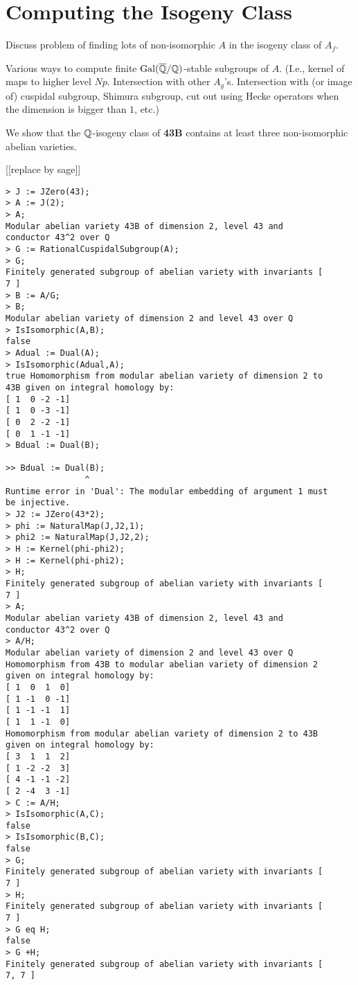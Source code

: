 \documentclass{article}
\begin{document}
\section{Computing the Isogeny Class}

Discuss problem of finding lots of non-isomorphic $A$ in the isogeny
class of $A_f$.

Various ways to compute finite $\operatorname{Gal}(\overline{\mathbb{Q}}/\mathbb{Q})$-stable subgroups of
$A$.  (I.e., kernel of maps to higher level $Np$.  Intersection with
other $A_g$'s.  Intersection with (or image of) cuspidal subgroup,
Shimura subgroup, cut out using Hecke operators when the dimension is
bigger than $1$, etc.)

\begin{example}
We show that the $\mathbb{Q}$-isogeny class of {\bf 43B} contains at least three
non-isomorphic abelian varieties.

[[replace by sage]]

\begin{verbatim}
> J := JZero(43);
> A := J(2);
> A;
Modular abelian variety 43B of dimension 2, level 43 and
conductor 43^2 over Q
> G := RationalCuspidalSubgroup(A);
> G;
Finitely generated subgroup of abelian variety with invariants [
7 ]
> B := A/G;
> B;
Modular abelian variety of dimension 2 and level 43 over Q
> IsIsomorphic(A,B);
false
> Adual := Dual(A);
> IsIsomorphic(Adual,A);
true Homomorphism from modular abelian variety of dimension 2 to
43B given on integral homology by:
[ 1  0 -2 -1]
[ 1  0 -3 -1]
[ 0  2 -2 -1]
[ 0  1 -1 -1]
> Bdual := Dual(B);

>> Bdual := Dual(B);
                ^
Runtime error in 'Dual': The modular embedding of argument 1 must
be injective.
> J2 := JZero(43*2);
> phi := NaturalMap(J,J2,1);
> phi2 := NaturalMap(J,J2,2);
> H := Kernel(phi-phi2);
> H := Kernel(phi-phi2);
> H;
Finitely generated subgroup of abelian variety with invariants [
7 ]
> A;
Modular abelian variety 43B of dimension 2, level 43 and
conductor 43^2 over Q
> A/H;
Modular abelian variety of dimension 2 and level 43 over Q
Homomorphism from 43B to modular abelian variety of dimension 2
given on integral homology by:
[ 1  0  1  0]
[ 1 -1  0 -1]
[ 1 -1 -1  1]
[ 1  1 -1  0]
Homomorphism from modular abelian variety of dimension 2 to 43B
given on integral homology by:
[ 3  1  1  2]
[ 1 -2 -2  3]
[ 4 -1 -1 -2]
[ 2 -4  3 -1]
> C := A/H;
> IsIsomorphic(A,C);
false
> IsIsomorphic(B,C);
false
> G;
Finitely generated subgroup of abelian variety with invariants [
7 ]
> H;
Finitely generated subgroup of abelian variety with invariants [
7 ]
> G eq H;
false
> G +H;
Finitely generated subgroup of abelian variety with invariants [
7, 7 ]
\end{verbatim}

\end{example}
\end{document}
